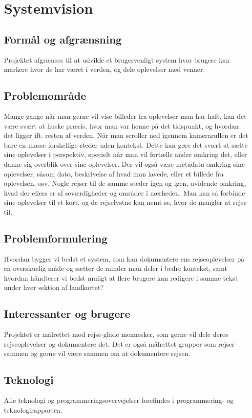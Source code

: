 \chapter{Systemvision}\label{ch:systemvision}

\section{Formål og afgrænsning}\label{sec:purpose}
Projektet afgrænses til at udvikle et brugervenligt system hvor brugere kan markere hvor de har været i verden, og dele oplevelser med venner.

\section{Problemområde}\label{sec:problemarea}
Mange gange når man gerne vil vise billeder fra oplevelser man har haft, kan det være svært at huske præcis, hvor man var henne på det tidspunkt, og hvordan det ligger ift. resten af verden. Når man scroller ned igennem kamerarullen er det bare en masse forskellige steder uden kontekst. Dette kan gøre det svært at sætte sine oplevelser i perspektiv, specielt når man vil fortælle andre omkring det, eller danne sig overblik over sine oplevelser. Der vil også være metadata omkring sine oplevelser, såsom dato, beskrivelse af hvad man lavede, eller et billede fra oplevelsen, osv. Nogle rejser til de samme steder igen og igen, uvidende omkring, hvad der ellers er af seværdigheder og områder i nærheden. Man kan så forbinde sine oplevelser til et kort, og de rejselystne kan nemt se, hvor de mangler at rejse til.

\section{Problemformulering}\label{sec:problemstatement}
Hvordan bygger vi bedst et system, som kan dokumentere ens rejseoplevelser på en overskuelig måde og sætter de minder man deler i bedre kontekst, samt hvordan håndterer vi bedst muligt at flere brugere kan redigere i samme tekst under hver sektion af landkortet?

\section{Interessanter og brugere}\label{sec:users}
Projektet er målrettet mod rejse-glade mennesker, som gerne vil dele deres rejseoplevelser og dokumentere det. Det er også målrettet grupper som rejser sammen og gerne vil være sammen om at dokumentere rejsen.

\section{Teknologi}\label{sec:technology}
Alle teknologi og programmeringsovervejelser forefindes i programmering- og teknologirapporten.